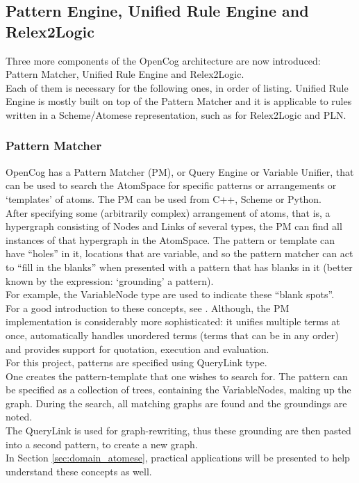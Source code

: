 \subsection{Pattern Engine, Unified Rule Engine and Relex2Logic}\label{sec:pattern_ur_engine}

Three more components of the OpenCog architecture are now introduced: Pattern Matcher, Unified Rule Engine and Relex2Logic. \\
Each of them is necessary for the following ones, in order of listing.
Unified Rule Engine is mostly built on top of the Pattern Matcher and it is applicable to rules written in a Scheme/Atomese representation, such as for Relex2Logic and PLN.

\subsubsection{Pattern Matcher}\label{sec:pattern_matcher}

OpenCog has a Pattern Matcher (PM), or Query Engine or Variable Unifier, that can be used to search the AtomSpace for specific patterns or arrangements or `templates' of atoms. 
The PM can be used from C++, Scheme or Python. \\
After specifying some (arbitrarily complex) arrangement of atoms, that is, a hypergraph consisting of Nodes and Links of several types, the PM can find all instances of that hypergraph in the AtomSpace. The pattern or template can have \enquote{holes} in it, locations that are variable, and so the pattern matcher can act to \enquote{fill in the blanks} when presented with a pattern that has blanks in it (better known by the expression: `grounding' a pattern). \\
For example, the VariableNode type are used to indicate these \enquote{blank spots}. \\
For a good introduction to these concepts, see \cite{baader_nipkow_1998}. Although, the PM implementation is considerably more sophisticated: it unifies multiple terms at once, automatically handles unordered terms (terms that can be in any order) and provides support for quotation, execution and evaluation. \\

For this project, patterns are specified using QueryLink type. \\
One creates the pattern-template that one wishes to search for. The pattern can be specified as a collection of trees, containing the VariableNodes, making up the graph. 
During the search, all matching graphs are found and the groundings are noted. \\
The QueryLink is used for graph-rewriting, thus these grounding are then pasted into a second pattern, to create a new graph. \\
In Section \ref{sec:domain_atomese}, practical applications will be presented to help understand these concepts as well.

